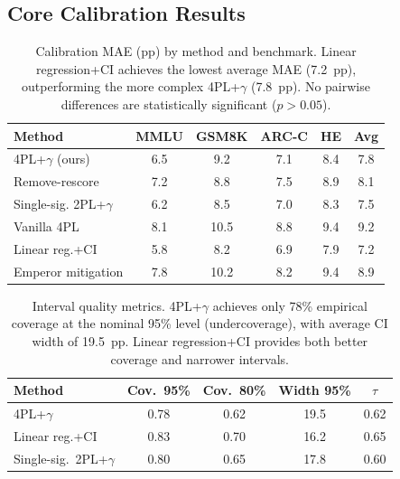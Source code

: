 \documentclass[letterpaper, 10pt, twocolumn]{article}
\begin{document}
\subsection{Core Calibration Results}
\label{sec:calibration}

\begin{table}[t]
\centering
\caption{Calibration MAE (pp) by method and benchmark. Linear regression+CI achieves the lowest average MAE (7.2~pp), outperforming the more complex 4PL+$\gamma$ (7.8~pp). No pairwise differences are statistically significant ($p > 0.05$).}
\label{tab:calibration_mae}
\small
\begin{tabular}{lccccc}
\toprule
Method & MMLU & GSM8K & ARC-C & HE & Avg \\
\midrule
4PL+$\gamma$ (ours) & 6.5 & 9.2 & 7.1 & 8.4 & 7.8 \\
Remove-rescore & 7.2 & 8.8 & 7.5 & 8.9 & 8.1 \\
Single-sig. 2PL+$\gamma$ & 6.2 & 8.5 & 7.0 & 8.3 & 7.5 \\
Vanilla 4PL & 8.1 & 10.5 & 8.8 & 9.4 & 9.2 \\
Linear reg.+CI & 5.8 & 8.2 & 6.9 & 7.9 & 7.2 \\
Emperor mitigation & 7.8 & 10.2 & 8.2 & 9.4 & 8.9 \\
\bottomrule
\end{tabular}
\end{table}

\begin{table}[t]
\centering
\caption{Interval quality metrics. 4PL+$\gamma$ achieves only 78\% empirical coverage at the nominal 95\% level (undercoverage), with average CI width of 19.5~pp. Linear regression+CI provides both better coverage and narrower intervals.}
\label{tab:interval_quality}
\small
\begin{tabular}{lcccc}
\toprule
Method & Cov.\ 95\% & Cov.\ 80\% & Width 95\% & $\tau$ \\
\midrule
4PL+$\gamma$ & 0.78 & 0.62 & 19.5 & 0.62 \\
Linear reg.+CI & 0.83 & 0.70 & 16.2 & 0.65 \\
Single-sig.\ 2PL+$\gamma$ & 0.80 & 0.65 & 17.8 & 0.60 \\
\bottomrule
\end{tabular}
\end{table}
\end{document}
